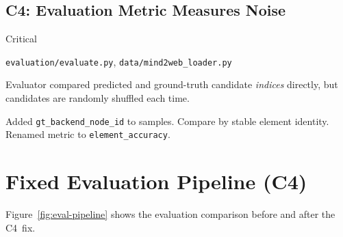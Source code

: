 \documentclass[11pt,a4paper]{article}
\begin{document}
\subsection{C4: Evaluation Metric Measures Noise}

\begin{description}[leftmargin=2cm,style=nextline]
\item[Severity] \textcolor{critical}{Critical}
\item[Files] \texttt{evaluation/evaluate.py}, \texttt{data/mind2web\_loader.py}
\item[Root Cause]
  Evaluator compared predicted and ground-truth candidate \emph{indices}
  directly, but candidates are randomly shuffled each time.
\item[Fix]
  Added \texttt{gt\_backend\_node\_id} to samples. Compare by stable
  element identity. Renamed metric to \texttt{element\_accuracy}.
\end{description}


\section{Fixed Evaluation Pipeline (C4)}

Figure~\ref{fig:eval-pipeline} shows the evaluation comparison
before and after the C4~fix.
\end{document}
